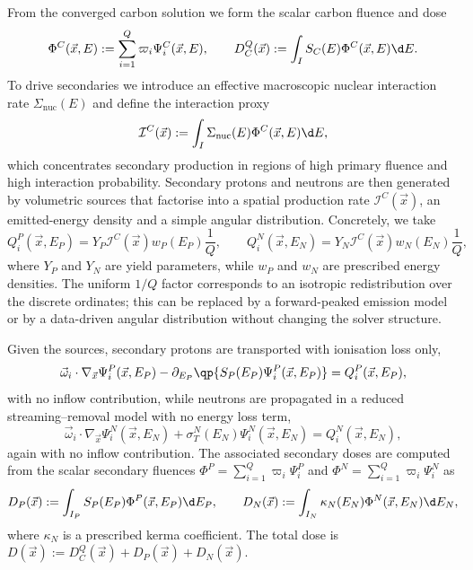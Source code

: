 \documentclass[final]{amsart}
\begin{document}
From the converged carbon solution we form the scalar carbon fluence and
dose
\begin{equation}
  \label{eq:carbon_primary_dose}
  \Phi^C(\vec{x},E) := \sum_{i=1}^Q \varpi_i \Psi^C_i(\vec{x},E),
  \qquad
  D_C^{Q}(\vec{x}) := \int_I S_C(E) \Phi^C(\vec{x},E) \d E.
\end{equation}
To drive secondaries we introduce an effective macroscopic nuclear
interaction rate $\Sigma_{\mathrm{nuc}}(E)$ and define the interaction
proxy
\begin{equation}
  \label{eq:interaction_proxy}
  \mathcal{I}^C(\vec{x})
  :=
  \int_I \Sigma_{\mathrm{nuc}}(E) \Phi^C(\vec{x},E) \d E,
\end{equation}
which concentrates secondary production in regions of high primary
fluence and high interaction probability. Secondary protons and neutrons
are then generated by volumetric sources that factorise into a spatial
production rate $\mathcal I^C(\vec x)$, an emitted-energy density and a
simple angular distribution. Concretely, we take
\begin{equation}
  \label{eq:secondary_sources}
  Q_i^P(\vec{x},E_P)
  =
  Y_P \mathcal{I}^C(\vec{x}) w_P(E_P) \frac{1}{Q},
  \qquad
  Q_i^N(\vec{x},E_N)
  =
  Y_N \mathcal{I}^C(\vec{x}) w_N(E_N) \frac{1}{Q},
\end{equation}
where $Y_P$ and $Y_N$ are yield parameters, while $w_P$ and $w_N$ are
prescribed energy densities. The uniform $1/Q$ factor corresponds to
an isotropic redistribution over the discrete ordinates; this can be
replaced by a forward-peaked emission model or by a data-driven
angular distribution without changing the solver structure.

Given the sources, secondary protons are transported with ionisation
loss only,
\begin{equation}
  \label{eq:secondary_proton_transport}
  \vec{\omega}_i \cdot \nabla_{\vec{x}} \Psi^P_i(\vec{x},E_P)
  -
  \partial_{E_P}\qp{S_P(E_P) \Psi^P_i(\vec{x},E_P)}
  =
  Q_i^P(\vec{x},E_P),
\end{equation}
with no inflow contribution, while neutrons are propagated in a reduced
streaming--removal model with no energy loss term,
\begin{equation}
  \label{eq:secondary_neutron_transport}
  \vec{\omega}_i \cdot \nabla_{\vec{x}} \Psi^N_i(\vec{x},E_N)
  +
  \sigma_T^N(E_N) \Psi^N_i(\vec{x},E_N)
  =
  Q_i^N(\vec{x},E_N),
\end{equation}
again with no inflow contribution. The associated secondary doses are
computed from the scalar secondary fluences
$\Phi^P=\sum_{i=1}^Q\varpi_i\Psi_i^P$ and $\Phi^N=\sum_{i=1}^Q\varpi_i\Psi_i^N$
as
\begin{equation}
  \label{eq:secondary_doses}
  D_P(\vec{x}) := \int_{I_P} S_P(E_P) \Phi^P(\vec{x},E_P) \d E_P,
  \qquad
  D_N(\vec{x}) := \int_{I_N} \kappa_N(E_N) \Phi^N(\vec{x},E_N) \d E_N,
\end{equation}
where $\kappa_N$ is a prescribed kerma coefficient. The total dose is
$D(\vec{x}) := D_C^{Q}(\vec{x}) + D_P(\vec{x}) + D_N(\vec{x})$.
\end{document}
